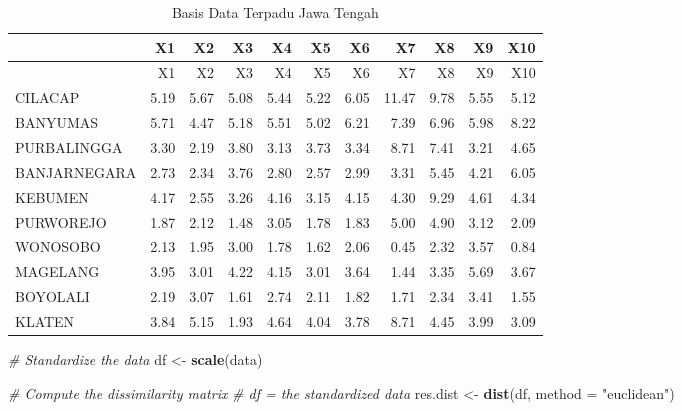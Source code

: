 \documentclass[
]{elegantbook}
\newenvironment{Shaded}{\begin{snugshade}}{\end{snugshade}}
\newcommand{\AttributeTok}[1]{\textcolor[rgb]{0.13,0.29,0.53}{#1}}
\newcommand{\CommentTok}[1]{\textcolor[rgb]{0.56,0.35,0.01}{\textit{#1}}}
\newcommand{\FunctionTok}[1]{\textcolor[rgb]{0.13,0.29,0.53}{\textbf{#1}}}
\newcommand{\NormalTok}[1]{#1}
\newcommand{\OtherTok}[1]{\textcolor[rgb]{0.56,0.35,0.01}{#1}}
\newcommand{\StringTok}[1]{\textcolor[rgb]{0.31,0.60,0.02}{#1}}
\begin{document}
\begin{longtable}[]{@{}lrrrrrrrrrr@{}}
\caption{\label{tab:nice-tab}Basis Data Terpadu Jawa Tengah}\tabularnewline
\toprule\noalign{}
& X1 & X2 & X3 & X4 & X5 & X6 & X7 & X8 & X9 & X10 \\
\midrule\noalign{}
\endfirsthead
\toprule\noalign{}
& X1 & X2 & X3 & X4 & X5 & X6 & X7 & X8 & X9 & X10 \\
\midrule\noalign{}
\endhead
\bottomrule\noalign{}
\endlastfoot
CILACAP & 5.19 & 5.67 & 5.08 & 5.44 & 5.22 & 6.05 & 11.47 & 9.78 & 5.55 & 5.12 \\
BANYUMAS & 5.71 & 4.47 & 5.18 & 5.51 & 5.02 & 6.21 & 7.39 & 6.96 & 5.98 & 8.22 \\
PURBALINGGA & 3.30 & 2.19 & 3.80 & 3.13 & 3.73 & 3.34 & 8.71 & 7.41 & 3.21 & 4.65 \\
BANJARNEGARA & 2.73 & 2.34 & 3.76 & 2.80 & 2.57 & 2.99 & 3.31 & 5.45 & 4.21 & 6.05 \\
KEBUMEN & 4.17 & 2.55 & 3.26 & 4.16 & 3.15 & 4.15 & 4.30 & 9.29 & 4.61 & 4.34 \\
PURWOREJO & 1.87 & 2.12 & 1.48 & 3.05 & 1.78 & 1.83 & 5.00 & 4.90 & 3.12 & 2.09 \\
WONOSOBO & 2.13 & 1.95 & 3.00 & 1.78 & 1.62 & 2.06 & 0.45 & 2.32 & 3.57 & 0.84 \\
MAGELANG & 3.95 & 3.01 & 4.22 & 4.15 & 3.01 & 3.64 & 1.44 & 3.35 & 5.69 & 3.67 \\
BOYOLALI & 2.19 & 3.07 & 1.61 & 2.74 & 2.11 & 1.82 & 1.71 & 2.34 & 3.41 & 1.55 \\
KLATEN & 3.84 & 5.15 & 1.93 & 4.64 & 4.04 & 3.78 & 8.71 & 4.45 & 3.99 & 3.09 \\
\end{longtable}

\begin{Shaded}
\begin{Highlighting}[]
\CommentTok{\# Standardize the data}
\NormalTok{df }\OtherTok{\textless{}{-}} \FunctionTok{scale}\NormalTok{(data)}
\end{Highlighting}
\end{Shaded}

\begin{Shaded}
\begin{Highlighting}[]
\CommentTok{\# Compute the dissimilarity matrix}
\CommentTok{\# df = the standardized data}
\NormalTok{res.dist }\OtherTok{\textless{}{-}} \FunctionTok{dist}\NormalTok{(df, }\AttributeTok{method =} \StringTok{"euclidean"}\NormalTok{)}
\end{Highlighting}
\end{Shaded}
\end{document}
